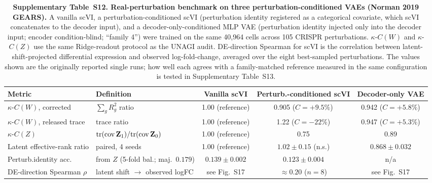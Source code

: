 \documentclass[11pt,a4paper]{article}
\begin{document}
\begin{table}[ht]
\centering
\caption*{\textbf{Supplementary Table~S12. Real-perturbation benchmark on three perturbation-conditioned VAEs (Norman 2019 GEARS).} A vanilla scVI, a perturbation-conditioned scVI (perturbation identity registered as a categorical covariate, which scVI concatenates to the decoder input), and a decoder-only-conditioned MLP VAE (perturbation identity injected only into the decoder input; encoder condition-blind; ``family 4'') were trained on the same 40,964 cells across 105 CRISPR perturbations. $\kappa$-$C(W)$ and $\kappa$-$C(Z)$ use the same Ridge-readout protocol as the UNAGI audit. DE-direction Spearman for scVI is the correlation between latent-shift-projected differential expression and observed log-fold-change, averaged over the eight best-sampled perturbations. The values shown are the originally reported single runs; how well each agrees with a family-matched reference measured in the same configuration is tested in Supplementary Table~S13.}
\label{tab:norman}
\small
\setlength{\tabcolsep}{3pt}
\footnotesize
\begin{tabular}{@{}llccc@{}}
\toprule
\textbf{Metric} & \textbf{Definition} & \textbf{Vanilla scVI} & \textbf{Perturb.-conditioned scVI} & \textbf{Decoder-only VAE} \\
\midrule
$\kappa$-$C(W)$, corrected & $\sum_g R^2_g$ ratio & 1.00 (reference) & 0.905 ($C=+9.5\%$) & 0.942 ($C=+5.8\%$) \\
$\kappa$-$C(W)$, released trace & trace ratio & 1.00 (reference) & 1.22 ($C=-22\%$) & 0.947 ($C=+5.3\%$) \\
$\kappa$-$C(Z)$ & $\mathrm{tr}(\mathrm{cov}\,\mathbf{Z}_1)/\mathrm{tr}(\mathrm{cov}\,\mathbf{Z}_0)$ & 1.00 (reference) & 0.75 & 0.89 \\
Latent effective-rank ratio & paired, 4 seeds & 1.00 (reference) & $1.02\pm0.15$ (n.s.) & $0.868\pm0.032$ \\
Perturb.\-identity acc.\ & from $Z$ (5-fold bal.; maj.\ $0.179$) & $0.139\pm0.002$ & $0.123\pm0.004$ & n/a \\
DE-direction Spearman $\rho$ & latent shift $\to$ observed logFC & see Fig.~S17 & $\approx0.20$ ($n=8$) & see Fig.~S17 \\
\bottomrule
\end{tabular}
\end{table}
\end{document}

